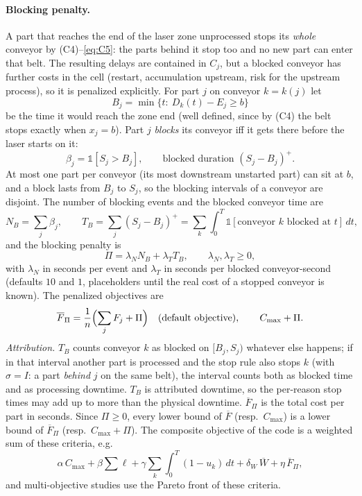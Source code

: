 \documentclass[11pt,a4paper]{article}
\theoremstyle{definition}
\theoremstyle{remark}
\begin{document}
\paragraph{Blocking penalty.} A part that reaches the end of the laser zone unprocessed
stops its \emph{whole} conveyor by (C4)--\eqref{eq:C5}: the parts behind it stop
too and no new part can enter that belt. The resulting delays are contained in $C_j$,
but a blocked conveyor has further costs in the cell (restart, accumulation upstream,
risk for the upstream process), so it is penalized explicitly. For part $j$ on conveyor
$k=k(j)$ let
\[
B_j=\min\{t:\ D_k(t)-E_j\ge b\}
\]
be the time it would reach the zone end (well defined, since by (C4) the belt
stops exactly when $x_j=b$). Part $j$ \emph{blocks} its conveyor iff it gets there
before the laser starts on it:
\begin{equation}\label{eq:block}
\beta_j=\mathbb 1[S_j>B_j],\qquad\text{blocked duration }(S_j-B_j)^+ .
\end{equation}
At most one part per conveyor (its most downstream unstarted part) can sit at $b$, and
a block lasts from $B_j$ to $S_j$, so the blocking intervals of a conveyor are disjoint.
The number of blocking events and the blocked conveyor time are
\[
N_B=\sum_j\beta_j,\qquad
T_B=\sum_j(S_j-B_j)^+=\sum_k\int_0^T\mathbb 1[\text{conveyor }k\text{ blocked at }t]\,dt ,
\]
and the blocking penalty is
\begin{equation}\label{eq:penalty}
\Pi=\lambda_N N_B+\lambda_T T_B,\qquad\lambda_N,\lambda_T\ge 0,
\end{equation}
with $\lambda_N$ in seconds per event and $\lambda_T$ in seconds per blocked
conveyor-second (defaults $10$ and $1$, placeholders until the real cost of a stopped
conveyor is known). The penalized objectives are
\[
\overline F_\Pi=\frac1n\Bigl(\sum_j F_j+\Pi\Bigr)\quad\text{(default objective)},\qquad
C_{\max}+\Pi .
\]
\emph{Attribution.} $T_B$ counts conveyor $k$ as blocked on $[B_j,S_j)$ whatever else
happens; if in that interval another part is processed and the stop rule also stops
$k$ (with $\sigma=I$: a part \emph{behind} $j$ on the same belt), the interval counts
both as blocked time and as processing downtime. $T_B$ is attributed downtime, so the
per-reason stop times may add up to more than the physical downtime.
$\overline F_\Pi$ is the total cost per part in seconds. Since $\Pi\ge 0$, every lower
bound of $\overline F$ (resp.\ $C_{\max}$) is a lower bound of $\overline F_\Pi$ (resp.\
$C_{\max}+\Pi$). The composite objective of the code is a weighted sum of these criteria,
e.g.
\[
\alpha\,C_{\max}+\beta\sum\ell+\gamma\sum_k\int_0^T(1-u_k)\,dt+\delta_W\,\overline{W}+\eta\,\overline F_\Pi ,
\]
and multi-objective studies use the Pareto front of these criteria.
\end{document}
